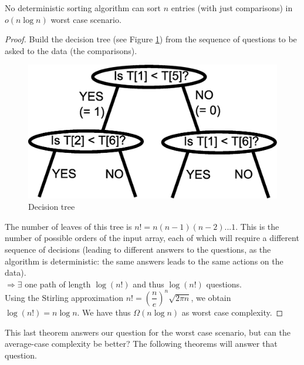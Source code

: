 \begin{theorem}
No deterministic sorting algorithm can sort $n$ entries (with just comparisons) in $o(n\log n)$ worst case scenario.
\end{theorem}
\begin{proof}
Build the decision tree (see Figure \ref{tree7}) from the sequence of questions to be asked to the data (the comparisons).
\begin{figure}[htbp]
\centering
\includegraphics[scale=0.5]{images/CM2/tree7.eps}
\caption{Decision tree}
\label{tree7}
\end{figure}
The number of leaves of this tree is $n! = n(n-1)(n-2)...1$. This is the number of possible orders of the input array, each of which will require a different sequence of decisions (leading to different answers to the questions, as the algorithm is deterministic: the same answers leads to the same actions on the data). \\

$\Rightarrow \exists$ one path of length $\log (n!)$ and thus $\log(n!)$ questions. \\

Using the Stirling approximation $n! = \left( \dfrac{n}{e} \right)^n \sqrt{2\pi n}$, we obtain $\log (n!) = n \log n$. We have thus $\Omega (n \log n)$ as worst case complexity.
\QED
\end{proof}

This last theorem answers our question for the worst case scenario, but can the average-case complexity be better? The following theorems will answer that question.\\

